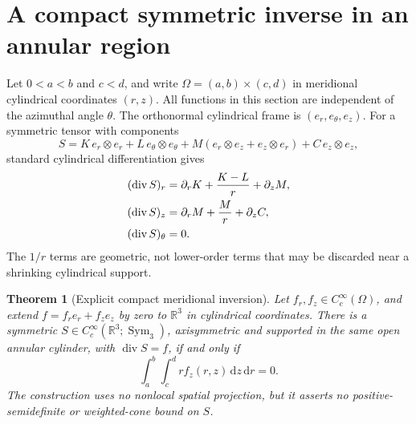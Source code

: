 \documentclass[11pt,a4paper]{article}
\theoremstyle{plain}
\newtheorem{theorem}{Theorem}[section]
\theoremstyle{definition}
\newcommand{\R}{\mathbb{R}}
\newcommand{\diver}{\operatorname{div}}
\newcommand{\cc}{C_c^{\infty}}
\newcommand{\dd}{\,\mathrm{d}}
\begin{document}
\section{A compact symmetric inverse in an annular region}

Let $0<a<b$ and $c<d$, and write
$\Omega=(a,b)\times(c,d)$ in meridional cylindrical coordinates $(r,z)$.
All functions in this section are independent of the azimuthal angle
$\theta$. The orthonormal cylindrical frame is $(e_r,e_\theta,e_z)$.
For a symmetric tensor with components
\begin{equation}\label{eq:stress}
  S=K\,e_r\otimes e_r+L\,e_\theta\otimes e_\theta
    +M(e_r\otimes e_z+e_z\otimes e_r)
    +C\,e_z\otimes e_z,
\end{equation}
standard cylindrical differentiation gives
\begin{align}
 (\diver S)_r&=\partial_rK+\frac{K-L}{r}+\partial_zM,
       \label{eq:divr}\\
 (\diver S)_z&=\partial_rM+\frac Mr+\partial_zC,
       \label{eq:divz}\\
 (\diver S)_\theta&=0.\notag
\end{align}
The $1/r$ terms are geometric, not lower-order terms that may be
discarded near a shrinking cylindrical support.

\begin{theorem}[Explicit compact meridional inversion]\label{thm:inverse}
Let $f_r,f_z\in\cc(\Omega)$, and extend
$f=f_r e_r+f_z e_z$ by zero to $\R^{3}$ in cylindrical coordinates.
There is a symmetric $S\in\cc(\R^{3};\operatorname{Sym}_3)$,
axisymmetric and supported in the same open annular cylinder, with
$\diver S=f$, if and only if
\begin{equation}\label{eq:vertical-force}
 \int_a^b\int_c^d r f_z(r,z)\dd z\dd r=0.
\end{equation}
The construction uses no nonlocal spatial projection, but it asserts no
positive-semidefinite or weighted-cone bound on $S$.
\end{theorem}
\end{document}
